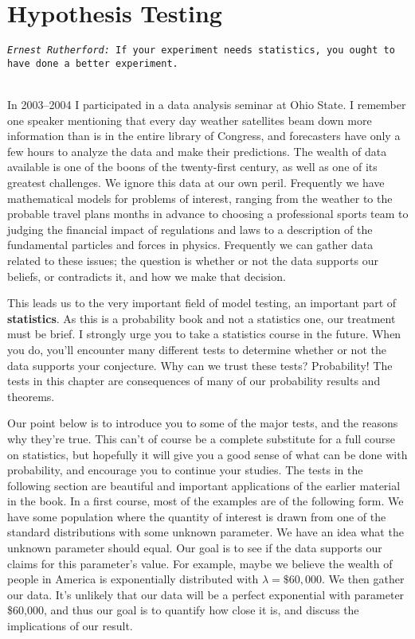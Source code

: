 
\chapter{Hypothesis Testing}

\noindent \texttt{\emph{Ernest Rutherford:} If your experiment needs statistics, you ought to have done a better experiment.}

\ \\

In 2003--2004 I participated in a data analysis seminar at Ohio State. I remember one speaker mentioning that every day weather satellites beam down more information than is in the entire library of Congress, and forecasters have only a few hours to analyze the data and make their predictions. The wealth of data available is one of the boons of the twenty-first century, as well as one of its greatest challenges. We ignore this data at our own peril. Frequently we have mathematical models for problems of interest, ranging from the weather to the probable travel plans months in advance to choosing a professional sports team to judging the financial impact of regulations and laws to a description of the fundamental particles and forces in physics. Frequently we can gather data related to these issues; the question is whether or not the data supports our beliefs, or contradicts it, and how we make that decision.

This leads us to the very important field of model testing, an important part of \textbf{statistics}. As this is a probability book and not a statistics one, our treatment must be brief. I strongly urge you to take a statistics course in the future. When you do,  you'll encounter many different tests to determine whether or not the data supports your conjecture. Why can we trust these tests? Probability! The tests in this chapter are consequences of many of our probability results and theorems.

Our point below is to introduce you to some of the major tests, and the reasons why they're true. This can't of course be a complete substitute for a full course on statistics, but hopefully it will give you a good sense of what can be done with probability, and encourage you to continue your studies. The tests in the following section are beautiful and important applications of the earlier material in the book. In a first course, most of the examples are of the following form. We have some population where the quantity of interest is drawn from one of the standard distributions with some unknown parameter. We have an idea what the unknown parameter should equal. Our goal is to see if the data supports our claims for this parameter's value. For example, maybe we believe the wealth of people in America is exponentially distributed with $\lambda = \$60,000$. We then gather our data. It's unlikely that our data will be a perfect exponential with parameter \$60,000, and thus our goal is to quantify how close it is, and discuss the implications of our result.

